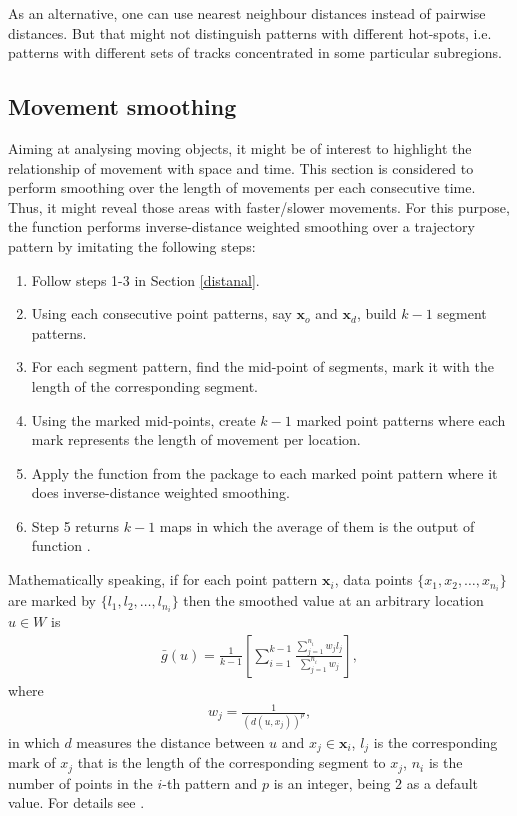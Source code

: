 \documentclass[article]{jss}
\begin{document}
As an alternative, one can use nearest neighbour distances instead of pairwise distances. But that might not distinguish patterns with different hot-spots, i.e. patterns with different sets of tracks concentrated in some particular subregions. 
  \subsection{Movement smoothing}
  Aiming at analysing moving objects, it might be of interest to highlight the relationship of movement with  space and time. This section is considered to perform smoothing over the length of movements per each consecutive time. Thus, it might reveal those areas with faster/slower movements. For this purpose, the function  performs inverse-distance weighted smoothing over a trajectory pattern by imitating the following steps:
  \begin{leftbar}
  \begin{enumerate}
  \item Follow steps 1-3 in Section \ref{distanal}.
  \item Using each consecutive point patterns, say $\mathbf{x}_o$ and $\mathbf{x}_d$, build $k-1$ segment patterns.
  \item For each segment pattern, find the mid-point of segments, mark it with the length of the corresponding segment.
  \item Using the marked mid-points, create $k-1$ marked point patterns where each mark represents the length of movement per location.
  \item Apply the function  from the package  \citep{BRT15} to each marked point pattern where it does inverse-distance weighted smoothing. 
  \item Step 5 returns $k-1$ maps in which the average of them is the output of function .
  \end{enumerate}
  \end{leftbar}
  Mathematically speaking, if for each point pattern $\mathbf{x}_i$, data points $\{ x_1,x_2,\ldots,x_{n_i} \}$ are marked by $\{ l_1,l_2,\ldots,l_{n_i} \}$ then the smoothed value at an arbitrary location $u\in W$ is
  \begin{eqnarray}
  \bar{g}(u)=\frac{1}{k-1} \left[ \sum\limits_{i=1}^{k-1} \frac{\sum\limits_{j=1}^{n_i}w_j l_j}{\sum\limits_{j=1}^{n_i} w_j} \right],
  \end{eqnarray}
  where 
  \begin{eqnarray}
  w_j=\frac{1}{(d(u,x_j))^p},
  \end{eqnarray}
  in which $d$ measures the distance between $u$ and $x_j \in \mathbf{x}_i$, $l_j$ is the corresponding mark of $x_j$ that is the length of the corresponding segment to $x_j$, $n_i$ is the number of points in the $i$-th pattern and $p$ is an integer, being $2$ as a default value. For details see \cite[Chapter 15]{BRT15}.
  
\end{document}

